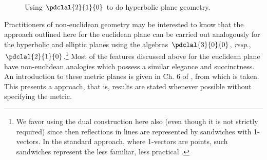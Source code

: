 \documentclass[12pt]{article}
\begin{document}
  \begin{figure}[t]
   \centering
{\setlength\fboxsep{0pt}}
\caption{Using $\pdclal{2}{1}{0}$ to do hyperbolic plane geometry.}
\label{fig:hypplane}
\end{figure}


Practitioners of non-euclidean geometry may be interested to know that the approach outlined here for the euclidean plane  can be carried out analogously for the hyperbolic and elliptic planes using the algebras $\pdclal{3}{0}{0}$, \textit{resp}., $\pdclal{2}{1}{0}$.\footnote{We favor using the dual construction here also (even though it is not strictly required) since then reflections in lines are represented by sandwiches with 1-vectors.  In the standard approach, where 1-vectors are points, such sandwiches represent the less familiar, less practical .} 
Most of the features discussed above for the euclidean plane have non-euclidean analogies which possess a similar elegance and succinctness. An introduction to these metric planes is given in Ch. 6 of \cite{gunnThesis}, from which  is taken. This presents a \emph{\MN} approach, that is, results are stated whenever possible without specifying the metric. %

\vspace{-.1in}
\end{document}
